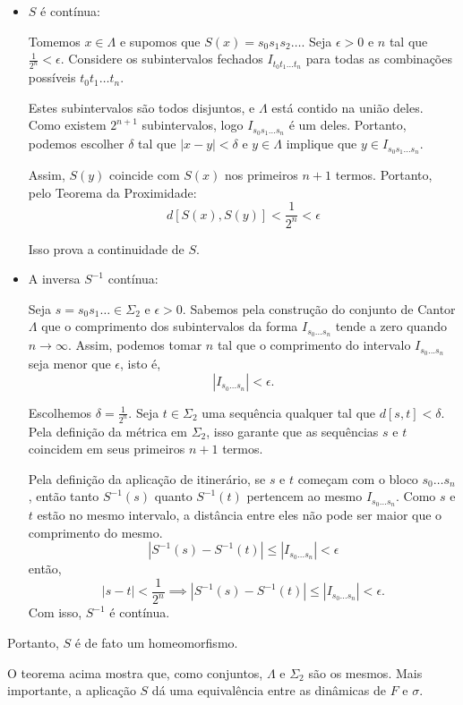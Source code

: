 \documentclass[../IC.tex]{subfiles}
\begin{document}
\begin{prova}
\begin{itemize}
			\item $S$ é contínua:
			
			Tomemos $x \in \Lambda$ e supomos que $S(x) = s_0s_1s_2 \dots$. Seja $\epsilon > 0$ e $n$ tal que $\frac{1}{2^n} < \epsilon$. Considere os subintervalos fechados $I_{t_0t_1\dots t_n}$ para todas as combinações possíveis $t_0t_1 \dots t_n$. 
			
			Estes subintervalos são todos disjuntos, e $\Lambda$ está contido na união deles. Como existem $2^{n+1}$ subintervalos, logo $I_{s_0s_1\dots s_n}$ é um deles. Portanto, podemos escolher $\delta$ tal que $|x - y| < \delta$ e $y \in \Lambda$ implique que $y \in I_{s_0s_1\dots s_n}$. 
			
			Assim, $S(y)$ coincide com $S(x)$ nos primeiros $n + 1$ termos. Portanto, pelo Teorema da Proximidade:
			$$ d[S(x), S(y)] < \frac{1}{2^n} < \epsilon $$
			
			Isso prova a continuidade de $S$.
			
			\item A inversa $S^{-1}$ contínua:
			
			Seja $s = s_0 s_1 \dots \in \Sigma_2$ e $\epsilon > 0$. Sabemos pela construção do conjunto de Cantor $\Lambda$ que o comprimento dos subintervalos da forma $I_{s_0 \dots s_n}$ tende a zero quando $n \to \infty$. Assim, podemos tomar $n$ tal que o comprimento do intervalo  $I_{s_0...s_n}$ seja menor que $\epsilon$, isto é,
			$$|I_{s_0 \dots s_n}| < \epsilon.$$
			
			Escolhemos $\delta = \frac{1}{2^n}$. Seja $t \in \Sigma_2$ uma sequência qualquer tal que $d[s, t] < \delta$. Pela definição da métrica em $\Sigma_2$, isso garante que as sequências $s$ e $t$ coincidem em seus primeiros $n+1$ termos. 
			
			Pela definição da aplicação de itinerário, se $s$ e $t$ começam com o bloco $s_0 \dots s_n$, então tanto $S^{-1}(s)$ quanto $S^{-1}(t)$ pertencem ao mesmo $I_{s_0 \dots s_n}$. 
			Como $s$ e $t$ estão no mesmo intervalo, a distância entre eles não pode ser maior que o comprimento do mesmo.
			$$ |S^{-1}(s) - S^{-1}(t)| \le |I_{s_0 \dots s_n}| < \epsilon $$
			então,
			$$|s-t|<\frac{1}{2^n} \implies |S^{-1}(s) - S^{-1}(t)| \le |I_{s_0 \dots s_n}| < \epsilon.$$
			Com isso, $S^{-1}$ é contínua.
		\end{itemize}
		
		Portanto, $S$ é de fato um homeomorfismo.
	\end{prova}
	
	O teorema acima mostra que, como conjuntos, $\Lambda$ e $\Sigma_2$ são os mesmos. Mais importante, a aplicação $S$ dá uma equivalência entre as dinâmicas de $F$ e $\sigma$.
	
\end{document}
